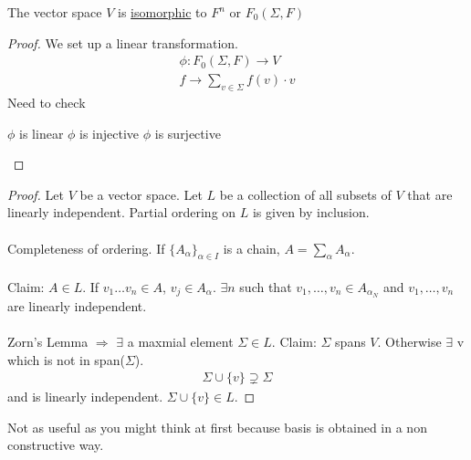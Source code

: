 \documentclass[class=scrartcl, crop=false]{standalone}
\begin{document}
\begin{corollary}
  The vector space $V$ is \ul{isomorphic} to $F^n$ or $F_0(\Sigma, F)$
  \begin{proof}
    We set up a linear transformation.
    \begin{gather*}
      \phi: F_0(\Sigma, F) \to V \\
      f \to \sum_{v \in \Sigma}f(v) \cdot v %
    \end{gather*} 
    Need to check
    \begin{enumerate}
      \ii
      $\phi$ is linear
      \ii
      $\phi$ is injective
      \ii
      $\phi$ is surjective
    \end{enumerate} 
  \end{proof} 
\end{corollary} 

\begin{theorem}
  \begin{proof}
    Let $V$ be a vector space. Let $L$ be a collection of all subsets of $V$ that are linearly independent. Partial ordering on $L$ is given by inclusion.
    \\\\
    Completeness of ordering. If $\{A_{\alpha}\}_{\alpha \in I}$ is a chain,  $A = \sum_{\alpha}A_{\alpha}$. %
    \\\\
    Claim:  $A \in L$. If $v_1 \dots v_n \in A$, $v_j \in A_{\alpha}$. $\exists n$ such that $v_1, \dots, v_n \in A_{\alpha_N}$ and $v_1, \dots, v_n$ are linearly independent.
    \\\\
    Zorn's Lemma $\Rightarrow$ $\exists$ a maxmial element $\Sigma \in L$. Claim: $\Sigma$ spans $V$. Otherwise $\exists$ v which is not in span($\Sigma$).
    \begin{gather*}
      \Sigma \cup \{v\} \supsetneq \Sigma
    \end{gather*} and is linearly independent. $\Sigma \cup \{v\} \in L$.
  \end{proof} 
  Not as useful as you might think at first because basis is obtained in a non constructive way. 
\end{theorem} 
\end{document}
